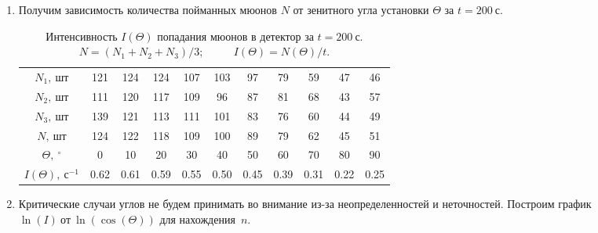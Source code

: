 \documentclass{lab}
\begin{document}
\begin{enumerate}
\item 
Получим зависимость количества пойманных мюонов $ N $ от зенитного угла установки $ \Theta $ за $ t = 200~с $.

\begin{table}[H]
	\centering
	\begin{tabular}{|c|cccccccccc|}
		\hline
		$ N_1,~шт $          & 121 & 124 & 124 & 107 & 103 & 97  & 79  & 59  & 47  & 46  \\
		$ N_2,~шт $          & 111 & 120 & 117 & 109 & 96  & 87  & 81  & 68  & 43  & 57  \\
		$ N_3,~шт $          & 139 & 121 & 113 & 111 & 101 & 83  & 76  & 60  & 44  & 49  \\
		$ N,~шт $            & 124 & 122 & 118 & 109 & 100 & 89  & 79  & 62  & 45  & 51  \\ \hline
		$ \Theta,~^{\circ} $ & 0   & 10  & 20  & 30  & 40  & 50  & 60  & 70  & 80  & 90  \\ 
		$ I(\Theta),~с^{-1} $& 0.62& 0.61& 0.59& 0.55& 0.50& 0.45& 0.39& 0.31& 0.22& 0.25\\ \hline
	\end{tabular}
	\caption{Интенсивность $ I(\Theta) $ попадания мюонов в детектор за $ t = 200~с $. $ N = (N_1 + N_2 + N_3) / 3 $; \ \ \ \ \ $ I(\Theta) = N(\Theta) / t $.}
	\label{tab-1}
\end{table}

\item 
Критические случаи углов не будем принимать во внимание из-за неопределенностей и неточностей. Построим график $ \ln (I)~от~\ln (\cos (\Theta)) $ для нахождения~$ n $.

\begin{figure}[H]
	\centering
\end{figure}
\end{enumerate}
\end{document}
